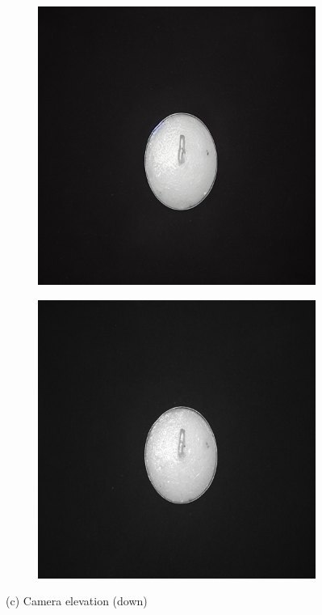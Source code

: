 \documentclass[12pt,DIV14,BCOR12mm,a4paper,footinclude=false,headinclude,parskip=half-,twoside,openright,cleardoublepage=empty,toc=index,bibliography=totoc,listof=totoc]{scrreprt}
\numberwithin{equation}{chapter}
\begin{document}
\begin{figure}
    \vspace{0.3cm} %

    \begin{subfigure}[t]{0.24\textwidth}
        \centering
        \includegraphics[width=\textwidth]{../media/diff_candles_down_real.png}
    \end{subfigure}%
    \hspace{0.02\textwidth}
    \begin{subfigure}[t]{0.24\textwidth}
        \centering
        \includegraphics[width=\textwidth]{../media/diff_candles_down_fake.png}
    \end{subfigure}
    \caption*{(c) Camera elevation (down)}


\end{figure}
\end{document}
